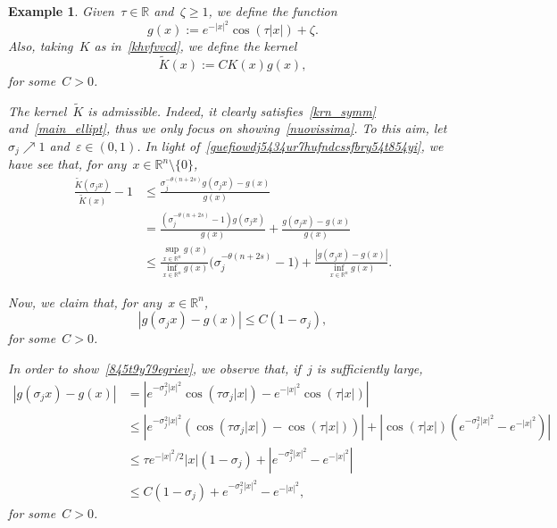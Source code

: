 \documentclass[10pt,a4paper]{amsart}
\newtheorem{example}[theorem]{Example}
\numberwithin{equation}{section}
\newcommand{\R}{\mathbb{R}}
\renewcommand{\epsilon}{\varepsilon}
\begin{document}
\begin{example}{\rm
Given~$\tau \in \R$ and~$\zeta \geq1$, we define the function
\[ g(x):=e^{-| x|^2}\cos(\tau | x| )+\zeta. \]
Also, taking~$K$ as in~\eqref{khvfvvcd}, we define the kernel
$$
\widetilde{K}(x):= C K(x) g(x),
$$
for some~$C>0$.

The kernel~$\widetilde{K}$ is admissible.
Indeed, it clearly satisfies~\eqref{krn_symm} and~\eqref{main_ellipt}, thus we only focus on showing~\eqref{nuovissima}. To this aim, let~$\sigma_j \nearrow 1$ and~$\epsilon \in (0,1)$. In light of~\eqref{guefiowdj5434ur7hufndcssfbry54t854yi}, we have see that,
for any~$x \in \R^n \setminus \{0\}$,
\begin{equation}\label{0j9h0h121}
\begin{split}
\frac{\widetilde{K}(\sigma_jx)}{\widetilde{K}(x)}-1 &\leq \frac{\sigma_j^{-\theta(n+2s)} g(\sigma_jx)-g(x)}{g(x)}\\&=  \frac{(\sigma_j^{-\theta(n+2s)} -1) g(\sigma_jx)}{g(x)}+\frac{g(\sigma_jx)-g(x)}{g(x)} \\
&\leq \frac{\displaystyle\sup_{x \in\R^n} g(x)}{\displaystyle\inf_{x\in\R^n} g(x)} \big(\sigma_j^{-\theta(n+2s)} -1\big) + \frac{|g(\sigma_jx)-g(x)|}{\displaystyle \inf_{x\in\R^n} g(x)}.
\end{split}
\end{equation}

Now, we claim that, for any~$x \in \R^n$,
\begin{equation}\label{845t9y79egriev}
|g(\sigma_jx)-g(x) |\leq C (1-\sigma_j),
\end{equation}
for some~$C>0$.

In order to show~\eqref{845t9y79egriev}, we observe that,
if~$j$ is sufficiently large,
\begin{equation}\label{bvfjf8y7776}
\begin{split}
|g(\sigma_jx)-g(x)|&=\left| e^{-\sigma_j^2 | x |^2}\cos(\tau \sigma_j | x |)- e^{-| x|^2}\cos(\tau | x| )\right| \\
&\le\left|  e^{-\sigma_j^2 | x |^2} \left( \cos(\tau \sigma_j | x |) -\cos(\tau  | x |)  \right) \right|+ \left|\cos(\tau | x |) \left(  e^{-\sigma_j^2 | x |^2} -e^{-| x|^2}\right)\right| \\
&\leq  \tau e^{- | x |^2 /2} | x |  (1-\sigma_j) + \left|  e^{-\sigma_j^2 | x |^2} -e^{-|x|^2}\right| \\
&\leq C (1-\sigma_j)+e^{-\sigma_j^2 | x|^2} -e^{-| x|^2},
\end{split}
\end{equation}
for some~$C>0$.

}
\end{example}
\end{document}
